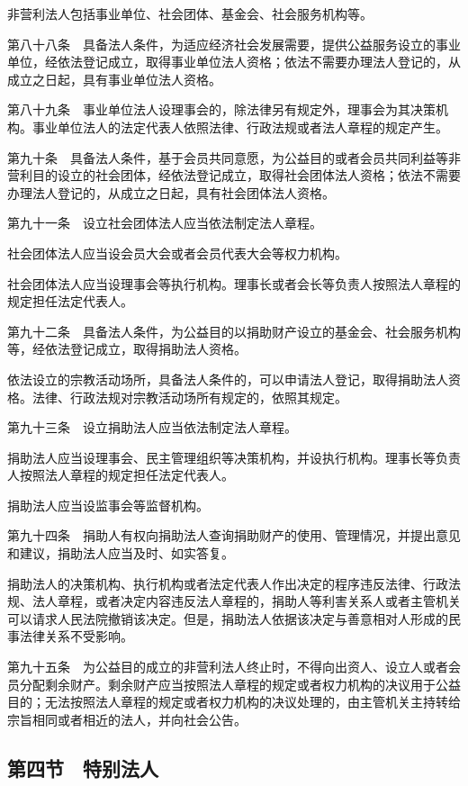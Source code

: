 \documentclass[UTF8,12pt,a4paper]{ctexbook}
\begin{document}
非营利法人包括事业单位、社会团体、基金会、社会服务机构等。

第八十八条　具备法人条件，为适应经济社会发展需要，提供公益服务设立的事业单位，经依法登记成立，取得事业单位法人资格；依法不需要办理法人登记的，从成立之日起，具有事业单位法人资格。

第八十九条　事业单位法人设理事会的，除法律另有规定外，理事会为其决策机构。事业单位法人的法定代表人依照法律、行政法规或者法人章程的规定产生。

第九十条　具备法人条件，基于会员共同意愿，为公益目的或者会员共同利益等非营利目的设立的社会团体，经依法登记成立，取得社会团体法人资格；依法不需要办理法人登记的，从成立之日起，具有社会团体法人资格。

第九十一条　设立社会团体法人应当依法制定法人章程。

社会团体法人应当设会员大会或者会员代表大会等权力机构。

社会团体法人应当设理事会等执行机构。理事长或者会长等负责人按照法人章程的规定担任法定代表人。

第九十二条　具备法人条件，为公益目的以捐助财产设立的基金会、社会服务机构等，经依法登记成立，取得捐助法人资格。

依法设立的宗教活动场所，具备法人条件的，可以申请法人登记，取得捐助法人资格。法律、行政法规对宗教活动场所有规定的，依照其规定。

第九十三条　设立捐助法人应当依法制定法人章程。

捐助法人应当设理事会、民主管理组织等决策机构，并设执行机构。理事长等负责人按照法人章程的规定担任法定代表人。

捐助法人应当设监事会等监督机构。

第九十四条　捐助人有权向捐助法人查询捐助财产的使用、管理情况，并提出意见和建议，捐助法人应当及时、如实答复。

捐助法人的决策机构、执行机构或者法定代表人作出决定的程序违反法律、行政法规、法人章程，或者决定内容违反法人章程的，捐助人等利害关系人或者主管机关可以请求人民法院撤销该决定。但是，捐助法人依据该决定与善意相对人形成的民事法律关系不受影响。

第九十五条　为公益目的成立的非营利法人终止时，不得向出资人、设立人或者会员分配剩余财产。剩余财产应当按照法人章程的规定或者权力机构的决议用于公益目的；无法按照法人章程的规定或者权力机构的决议处理的，由主管机关主持转给宗旨相同或者相近的法人，并向社会公告。

\subsection*{第四节　特别法人}
\end{document}
